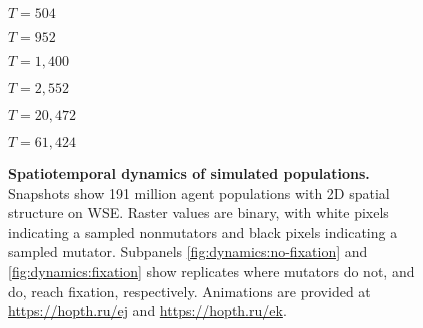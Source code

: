 \begin{figure}
{\begin{minipage}{\textwidth}
  \begin{minipage}[c]{0.154\textwidth}
\hfill
\begin{varwidth}{\textwidth}
$T = 504$
\end{varwidth}
\hfill
  \end{minipage}
  \begin{minipage}[c]{0.154\textwidth}
\hfill
\begin{varwidth}{\textwidth}
$T = 952$
\end{varwidth}
\hfill
  \end{minipage}
  \begin{minipage}[c]{0.154\textwidth}
\hfill
\begin{varwidth}{\textwidth}
$T = 1,400$
\end{varwidth}
\hfill
  \end{minipage}
  \begin{minipage}[c]{0.154\textwidth}
\hfill
\begin{varwidth}{\textwidth}
$T = 2,552$
\end{varwidth}
\hfill
  \end{minipage}
  \begin{minipage}[c]{0.154\textwidth}
\hfill
\begin{varwidth}{\textwidth}
$T = 20,472$
\end{varwidth}
\hfill
  \end{minipage}
  \begin{minipage}[c]{0.154\textwidth}
\hfill
\begin{varwidth}{\textwidth}
$T = 61,424$
\end{varwidth}
\hfill
  \end{minipage}

  \end{minipage}%
  }%

\vspace{-2ex}

  \caption{
  \textbf{Spatiotemporal dynamics of simulated populations.}
  \footnotesize
  Snapshots show 191 million agent populations with 2D spatial structure on WSE.
  Raster values are binary, with white pixels indicating a sampled nonmutators and black pixels indicating a sampled mutator.
  Subpanels \ref{fig:dynamics:no-fixation} and       \ref{fig:dynamics:fixation} show replicates where mutators do not, and do, reach fixation, respectively.
  Animations are provided at \url{https://hopth.ru/ej} and \url{https://hopth.ru/ek}.
  }
  \label{fig:dynamics}

\vspace{-3ex}

\end{figure}
